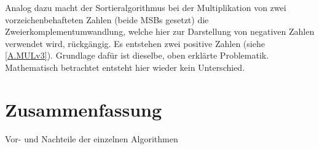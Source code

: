 \documentclass[fleqn, a4paper, 11pt]{article}       %
\begin{document}
Analog dazu macht der Sortieralgorithmus bei der Multiplikation von zwei vorzeichenbehafteten Zahlen (beide MSBs gesetzt) die Zweierkomplementumwandlung, welche hier zur Darstellung von negativen Zahlen verwendet wird, rückgängig. Es entstehen zwei positive Zahlen (siehe \ref{A.MULv3}). Grundlage dafür ist dieselbe, oben erklärte Problematik. Mathematisch betrachtet entsteht hier wieder kein Unterschied.


\section{Zusammenfassung}

\begin{compactitem}
    \item Vor- und Nachteile der einzelnen Algorithmen
\end{compactitem}




%
\end{document}
